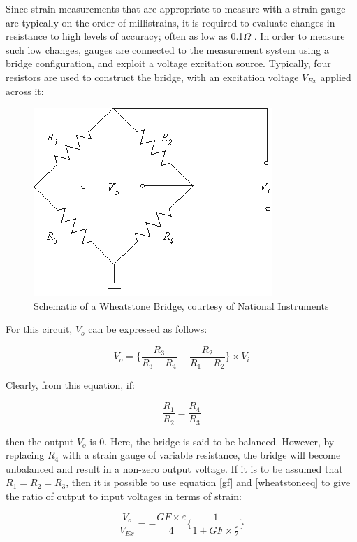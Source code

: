 \documentclass[12pt]{article}
\begin{document}
Since strain measurements that are appropriate to measure with a strain gauge are typically on the order of millistrains, it is required to evaluate changes in resistance to high levels of accuracy; often as low as 0.1$\Omega$ \cite{wheatstone}. In order to measure such low changes, gauges are connected to the measurement system using a bridge configuration, and exploit a voltage excitation source. Typically, four resistors are used to construct the bridge, with an excitation voltage $V_{Ex}$ applied across it:
\begin{figure}[H]
\begin{center}


\includegraphics[width=.5\linewidth]{Graphic1}
\caption{\label{wheat}Schematic of a Wheatstone Bridge, courtesy of National Instruments}
\end{center}
\end{figure}


For this circuit, $V_o$ can be expressed as follows:

\begin{equation} \label{wheatstoneeq}
V_o = \bigg \lbrace \frac{R_3}{R_3 + R_4} - \frac{R_2}{R_1 + R_2} \bigg \rbrace \times V_i
\end{equation}

Clearly, from this equation, if:

\begin{equation}
\frac{R_1}{R_2} = \frac{R_4}{R_3}
\end{equation}

then the output $V_o$ is 0. Here, the bridge is said to be balanced. However, by replacing \textnormal{$R_4$} with a strain gauge of variable resistance, the bridge will become unbalanced and result in a non-zero output voltage. If it is to be assumed that \textnormal{$R_1 = R_2 = R_3$}, then it is possible to use equation \ref{gf} and \ref{wheatstoneeq} to give the ratio of output to input voltages in terms of strain:

\begin{equation}\label{bigdaddy}
\frac{V_o}{V_{Ex}} = -\frac{GF\times \varepsilon}{4} \bigg \lbrace \frac{1}{1 + GF\times \frac{\varepsilon}{2}} \bigg \rbrace
\end{equation}
\end{document}
